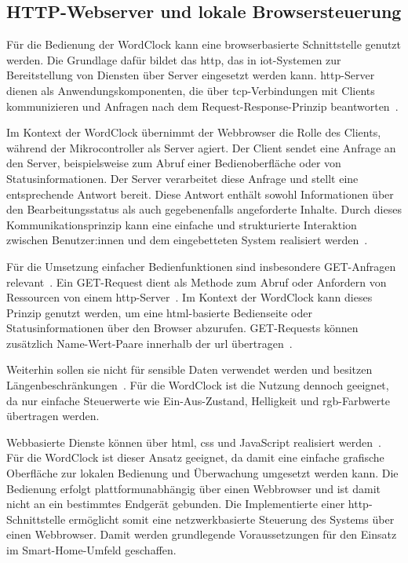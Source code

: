 \subsection{HTTP-Webserver und lokale Browsersteuerung}
Für die Bedienung der WordClock kann eine browserbasierte Schnittstelle genutzt werden.
Die Grundlage dafür bildet das \gls{http}, das in \gls{iot}-Systemen zur Bereitstellung von Diensten über Server eingesetzt werden kann.
\gls{http}-Server dienen als Anwendungskomponenten, die über \gls{tcp}-Verbindungen mit Clients kommunizieren und Anfragen nach dem Request-Response-Prinzip beantworten~\cite{hou2016iotcloud}.

Im Kontext der WordClock übernimmt der Webbrowser die Rolle des Clients, während der Mikrocontroller als Server agiert.
Der Client sendet eine Anfrage an den Server, beispielsweise zum Abruf einer Bedienoberfläche oder von Statusinformationen.
Der Server verarbeitet diese Anfrage und stellt eine entsprechende Antwort bereit.
Diese Antwort enthält sowohl Informationen über den Bearbeitungsstatus als auch gegebenenfalls angeforderte Inhalte.
Durch dieses Kommunikationsprinzip kann eine einfache und strukturierte Interaktion zwischen Benutzer:innen und dem eingebetteten System realisiert werden~\cite{W3Shttp}.

Für die Umsetzung einfacher Bedienfunktionen sind insbesondere GET-Anfragen relevant~\cite{hou2016iotcloud}.
Ein GET-Request dient als Methode zum Abruf oder Anfordern von Ressourcen von einem \gls{http}-Server~\cite{W3Shttp,hou2016iotcloud}.
Im Kontext der WordClock kann dieses Prinzip genutzt werden, um eine \gls{html}-basierte Bedienseite oder Statusinformationen über den Browser abzurufen.
GET-Requests können zusätzlich Name-Wert-Paare innerhalb der \gls{url} übertragen~\cite{W3Shttp}.

Weiterhin sollen sie nicht für sensible Daten verwendet werden und besitzen Längenbeschränkungen~\cite{W3Shttp}.
Für die WordClock ist die Nutzung dennoch geeignet, da nur einfache Steuerwerte wie Ein-Aus-Zustand, Helligkeit und \gls{rgb}-Farbwerte übertragen werden.

Webbasierte Dienste können über \gls{html}, \gls{css} und JavaScript realisiert werden~\cite{hou2016iotcloud}.
Für die WordClock ist dieser Ansatz geeignet, da damit eine einfache grafische Oberfläche zur lokalen Bedienung und Überwachung umgesetzt werden kann.
Die Bedienung erfolgt plattformunabhängig über einen Webbrowser und ist damit nicht an ein bestimmtes Endgerät gebunden.
Die Implementierte einer \gls{http}-Schnittstelle ermöglicht somit eine netzwerkbasierte Steuerung des Systems über einen Webbrowser.
Damit werden grundlegende Voraussetzungen für den Einsatz im Smart-Home-Umfeld geschaffen.
